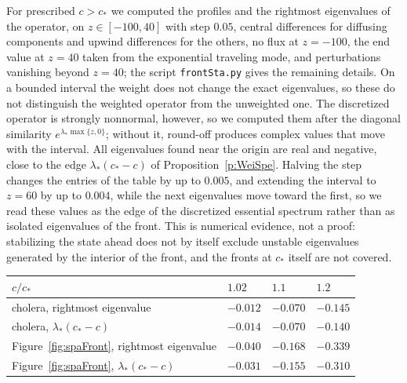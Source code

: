 For prescribed $c>c_*$ we computed the profiles and the rightmost eigenvalues of the operator, on $z\in[-100,40]$ with step $0.05$, central differences for diffusing components and upwind differences for the others, no flux at $z=-100$, the end value at $z=40$ taken from the exponential traveling mode, and perturbations vanishing beyond $z=40$; the script \texttt{frontSta.py} gives the remaining details. On a bounded interval the weight does not change the exact eigenvalues, so these do not distinguish the weighted operator from the unweighted one. The discretized operator is strongly nonnormal, however, so we computed them after the diagonal similarity $e^{\lambda_*\max\{z,0\}}$; without it, round-off produces complex values that move with the interval. All eigenvalues found near the origin are real and negative, close to the edge $\lambda_*(c_*-c)$ of Proposition~\ref{p:WeiSpe}. Halving the step changes the entries of the table by up to $0.005$, and extending the interval to $z=60$ by up to $0.004$, while the next eigenvalues move toward the first, so we read these values as the edge of the discretized essential spectrum rather than as isolated eigenvalues of the front. This is numerical evidence, not a proof: stabilizing the state ahead does not by itself exclude unstable eigenvalues generated by the interior of the front, and the fronts at $c_*$ itself are not covered.
\begin{center}
\begin{tabular}{llll}
\hline
$c/c_*$ & $1.02$ & $1.1$ & $1.2$\\\hline
cholera, rightmost eigenvalue & $-0.012$ & $-0.070$ & $-0.145$\\
cholera, $\lambda_*(c_*-c)$ & $-0.014$ & $-0.070$ & $-0.140$\\
Figure~\ref{fig:spaFront}, rightmost eigenvalue & $-0.040$ & $-0.168$ & $-0.339$\\
Figure~\ref{fig:spaFront}, $\lambda_*(c_*-c)$ & $-0.031$ & $-0.155$ & $-0.310$\\\hline
\end{tabular}
\end{center}
\eeR
